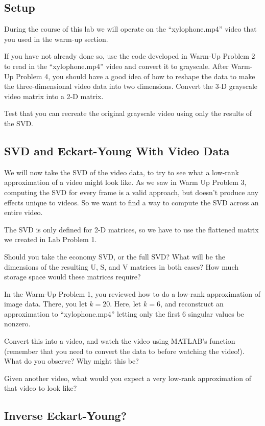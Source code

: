 \subsection{Setup}

During the course of this lab we will operate on the ``xylophone.mp4'' video that you used in the warm-up section.

If you have not already done so, use the code developed in Warm-Up Problem 2 to read in the ``xylophone.mp4'' video and convert it to grayscale. After Warm-Up Problem 4, you should have a good idea of how to reshape the data to make the three-dimensional video data into two dimensions. Convert the 3-D grayscale video matrix into a 2-D matrix.


Test that you can recreate the original grayscale video using only the results of the SVD.

\subsection{SVD and Eckart-Young With Video Data}

We will now take the SVD of the video data, to try to see what a low-rank approximation of a video might look like. As we saw in Warm Up Problem 3, computing the SVD for every frame is a valid approach, but doesn't produce any effects unique to videos. So we want to find a way to compute the SVD across an entire video.

The SVD is only defined for 2-D matrices, so we have to use the flattened matrix we created in Lab Problem 1.

Should you take the economy SVD, or the full SVD? What will be the dimensions of the resulting U, S, and V matrices in both cases? How much storage space would these matrices require?

In the Warm-Up Problem 1, you reviewed how to do a low-rank approximation of image data. There, you let $k = 20$. Here, let $k = 6$, and reconstruct an approximation to ``xylophone.mp4'' letting only the first 6 singular values be nonzero.

Convert this into a video, and watch the video using MATLAB's  function (remember that you need to convert the data to  before watching the video!). What do you observe? Why might this be?

Given another video, what would you expect a very low-rank approximation of that video to look like?

\subsection{Inverse Eckart-Young?}

